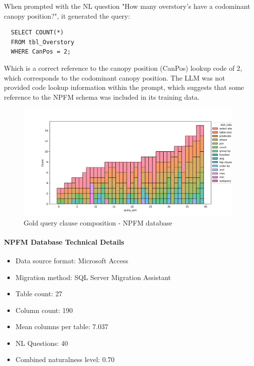 When prompted with the NL question "How many overstory's have a codominant canopy position?", it generated the query:

\begin{verbatim}
  SELECT COUNT(*)
  FROM tbl_Overstory
  WHERE CanPos = 2;
\end{verbatim}

Which is a correct reference to the canopy position (CanPos) lookup code of 2, which corresponds to the codominant canopy position.
The LLM was not provided code lookup information within the prompt, which suggests that some reference to the NPFM schema was included in its training data.

\begin{figure}[H]
  \centering
  \includegraphics[width=\linewidth]{figures/query-stats/NorthernPlainsFireManagement-stats-clause-counts.png}
  \caption{Gold query clause composition - NPFM database}
  \label{fig:query-complexity-npfm}
\end{figure}

\paragraph{NPFM Database Technical Details}
\begin{itemize}
  \item Data source format: Microsoft Access
  \item Migration method: SQL Server Migration Assistant
  \item Table count: 27
  \item Column count: 190
  \item Mean columns per table: 7.037
  \item NL Questions: 40
  \item Combined naturalness level: 0.70 
\end{itemize}

